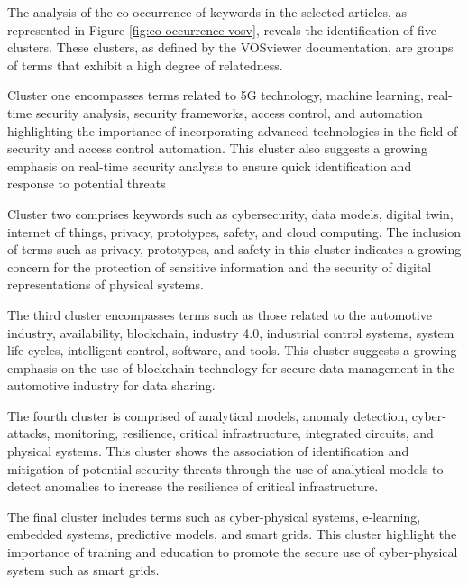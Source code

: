 The analysis of the co-occurrence of keywords in the selected articles, as represented in Figure \ref{fig:co-occurrence-vosv}, reveals the identification of five clusters. These clusters, as defined by the VOSviewer documentation, are groups of terms that exhibit a high degree of relatedness. 

Cluster one encompasses terms related to 5G technology, machine learning, real-time security analysis, security frameworks, access control, and automation highlighting the importance of incorporating advanced technologies in the field of security and access control automation. This cluster also suggests a growing emphasis on real-time security analysis to ensure quick identification and response to potential threats

Cluster two comprises keywords such as cybersecurity, data models, digital twin, internet of things, privacy, prototypes, safety, and cloud computing. The inclusion of terms such as privacy, prototypes, and safety in this cluster indicates a growing concern for the protection of sensitive information and the security of digital representations of physical systems. 

The third cluster encompasses terms such as those related to the automotive industry, availability, blockchain, industry 4.0, industrial control systems, system life cycles, intelligent control, software, and tools. This cluster suggests a growing emphasis on the use of blockchain technology for secure data management in the automotive industry for data sharing. 

The fourth cluster is comprised of analytical models, anomaly detection, cyber-attacks, monitoring, resilience, critical infrastructure, integrated circuits, and physical systems. This cluster shows the association of identification and mitigation of potential security threats through the use of analytical models to detect anomalies to increase the resilience of critical infrastructure.

The final cluster includes terms such as cyber-physical systems, e-learning, embedded systems, predictive models, and smart grids. This cluster highlight the importance of training and education to promote the secure use of cyber-physical system such as smart grids.